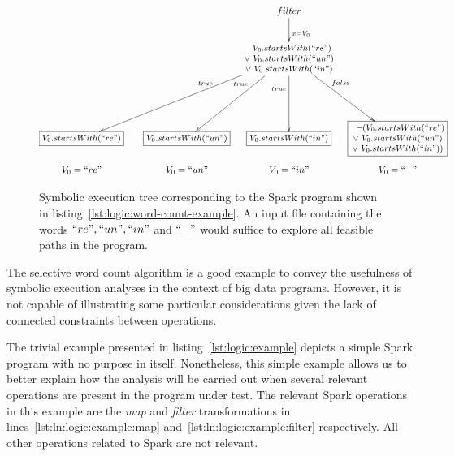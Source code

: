 \begin{figure}[t]
	\[\xymatrix@C=0.3em @R=0.8em{ 
		& & & & & \ar[dd]^<(0.4){x = V_{0}} filter & & \\
		& & & & & & & \\
		& & & & & \ar@{}[llllldddd]_<(0.2){true} \ar[llllldddd]
		\ar@{}[lldddd]_<(0.2){true} \ar[lldddd]
		\ar@{}[dddd]_<(0.2){true} \ar[dddd]
		\txt{\small $~~V_{0}.startsWith(``re")$ \\ 
			\small $\lor ~V_{0}.startsWith(``un")$ \\
			\small $\lor ~V_{0}.startsWith(``in")$} 
		\ar[rrdddd] \ar@{}[rrdddd]^<(0.2){false} & & \\
		& & & & & & & \\
		& & & & & & & \\
		& & & & & & & \\
		*+[F] \txt{\small $V_{0}.startsWith(``re")$} & & &
		*+[F] \txt{\small $V_{0}.startsWith(``un")$} & & 
		*+[F] \txt{\small $V_{0}.startsWith(``in")$} & &
		*+[F] \txt{\small $~~\lnot(V_{0}.startsWith(``re")$ \\ 
			\small $\lor ~V_{0}.startsWith(``un")$ \\
			\small $\lor ~V_{0}.startsWith(``in"))$} \\
		V_{0} = ``re" & & & V_{0} = ``un" & &  V_{0} = ``in" & & V_{0} = ``\_" \\
	} \]
	\caption[Symbolic Execution Tree of the Selective Word Count Example]{Symbolic execution tree corresponding to the Spark program shown in listing~\ref{lst:logic:word-count-example}. An input file containing the words $``re",``un",``in"$ and $``\_"$ would suffice to explore all feasible paths in the program.}
	\label{fig:logic:symbolic-spark-word-count-example}
\end{figure}


The selective word count algorithm is a good example to convey the usefulness of symbolic execution analyses in the context of big data programs. However, it is not capable of illustrating some particular considerations given the lack of connected constraints between operations. 

The trivial example presented in listing~\ref{lst:logic:example} depicts a simple Spark program with no purpose in itself. Nonetheless, this simple example allows us to better explain how the analysis will be carried out when several relevant operations are present in the program under test. The relevant Spark operations in this example are the \textit{map} and \textit{filter} transformations in lines~\ref{lst:ln:logic:example:map} and~\ref{lst:ln:logic:example:filter} respectively. All other operations related to Spark are not relevant.

